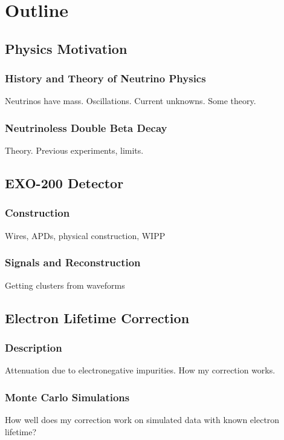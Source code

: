 \documentclass[12pt,letterpaper,onecolumn]{article}
\begin{document}
\section{Outline}

\subsection{Physics Motivation}

\subsubsection{History and Theory of Neutrino Physics}
Neutrinos have mass. Oscillations. Current unknowns. Some theory.

\subsubsection{Neutrinoless Double Beta Decay}
Theory. Previous experiments, limits.

\subsection{EXO-200 Detector}

\subsubsection{Construction}
Wires, APDs, physical construction, WIPP

\subsubsection{Signals and Reconstruction}
Getting clusters from waveforms

\subsection{Electron Lifetime Correction}

\subsubsection{Description}
Attenuation due to electronegative impurities. How my correction works.

\subsubsection{Monte Carlo Simulations}
How well does my correction work on simulated data with known electron lifetime?
\end{document}
